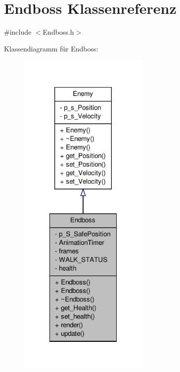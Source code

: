 \hypertarget{class_endboss}{\section{Endboss Klassenreferenz}
\label{class_endboss}
}


{\ttfamily \#include $<$Endboss.\-h$>$}



Klassendiagramm für Endboss\-:
\nopagebreak
\begin{figure}[H]
\begin{center}
\leavevmode
\includegraphics[width=180pt]{class_endboss__inherit__graph}
\end{center}
\end{figure}


